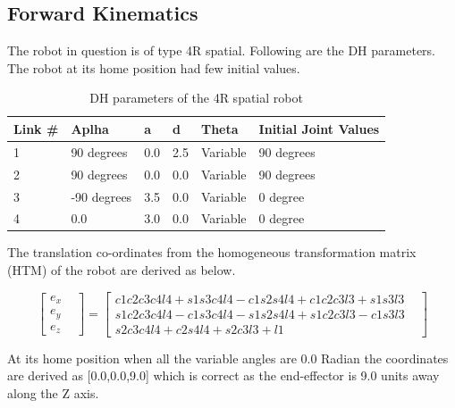 \documentclass[11pt]{article}
\begin{document}
\subsection{Forward Kinematics}

The robot in question is of type 4R spatial. Following are the DH parameters. The robot at its home position had few initial values.

\begin{table}[h]
\centering
\begin{tabular}{|l|l|l|l|l|l|}
Link \# & Aplha       & a   & d   & Theta    & Initial Joint Values \\\hline
1       & 90 degrees  & 0.0 & 2.5 & Variable & 90 degrees           \\\hline
2       & 90 degrees  & 0.0 & 0.0 & Variable & 90 degrees           \\\hline
3       & -90 degrees & 3.5 & 0.0 & Variable & 0 degree             \\\hline
4       & 0.0         & 3.0 & 0.0 & Variable & 0 degree             \\\hline    
\end{tabular}
\caption{DH parameters of the 4R spatial robot}
\end{table}

The translation co-ordinates from the homogeneous transformation matrix (HTM) of the robot are derived as below.

\[
\begin{bmatrix}
    e_{x}       & \\
    e_{y}       & \\
    e_{z}       &
\end{bmatrix}
=
\begin{bmatrix}
c1c2c3c4l4+s1s3c4l4-c1s2s4l4+c1c2c3l3+s1s3l3 & \\
s1c2c3c4l4-c1s3c4l4-s1s2s4l4+s1c2c3l3-c1s3l3 & \\
s2c3c4l4+c2s4l4+s2c3l3+l1
\end{bmatrix}
\]

At its home position when all the variable angles are 0.0 Radian the coordinates are derived as [0.0,0.0,9.0] which is correct as the end-effector is 9.0 units away along the Z axis.
\end{document}
